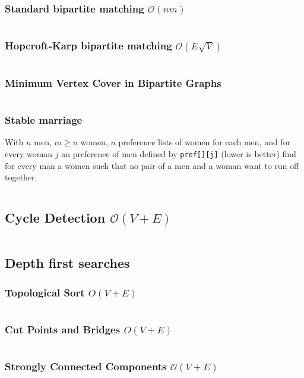 \documentclass[8pt,a4paper,landscape,oneside]{amsart}
\newcommand{\mintedstyle}[2]{\inputminted[fontsize=\normalsize,baselinestretch=.9,breaklines,breakautoindent,tabsize=2]{#1}{code/#2}}
\newcommand{\code}[1]{\mintedstyle{cpp}{#1}}
\begin{document}
\begin{multicols*}{3}
\begin{description}
\end{description}
\subsubsection{Standard bipartite matching $\mathcal{O}(n m)$}
\code{graphs/maxmatch.cpp}

\subsubsection{Hopcroft-Karp bipartite matching $\mathcal{O}(E \sqrt{V})$}
\code{graphs/hopcroft_karp.cpp}

\subsubsection{Minimum Vertex Cover in Bipartite Graphs}
\label{sec:mvc}
\code{graphs/bipartite_mvc.cpp}

\subsubsection{Stable marriage}
With $n$ men, $m \geq n$ women, $n$ preference lists of women for each men, and
for every woman $j$ an preference of men defined by \texttt{pref[][j]} (lower is better)
find for every man a women such that no pair of a men and a woman want to run off together.
\code{graphs/stable.cpp}

\subsection{Cycle Detection $\mathcal{O}(V + E)$}
\code{findcycle.cpp}

\subsection{Depth first searches}

\subsubsection{Topological Sort $O(V+E)$}
\code{graphs/toposort.cpp}

\subsubsection{Cut Points and Bridges $O(V+E)$}
\code{graphs/cut_points_and_bridges.cpp}

\subsubsection{Strongly Connected Components $\mathcal{O}(V + E)$}
\code{graphs/scc.cpp}


\end{multicols*}
\end{document}
